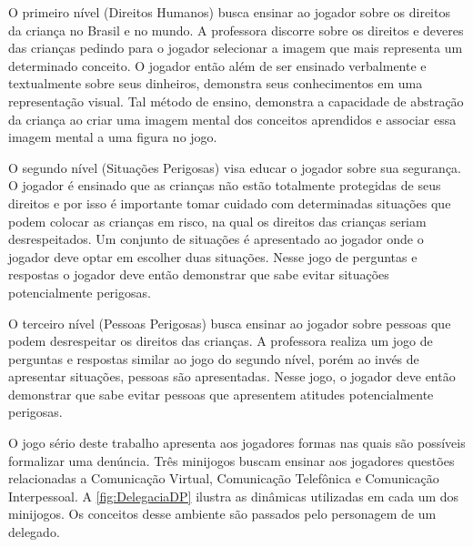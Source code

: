 O primeiro nível (Direitos Humanos) busca ensinar ao jogador sobre os direitos da criança no Brasil e no mundo. A professora discorre sobre os direitos e deveres das crianças pedindo para o jogador selecionar a imagem que mais representa um determinado conceito. O jogador então além de ser ensinado verbalmente e textualmente sobre seus dinheiros, demonstra seus conhecimentos em uma representação visual. Tal método de ensino, demonstra a capacidade de abstração da criança ao criar uma imagem mental dos conceitos aprendidos e associar essa imagem mental a uma figura no jogo. 

O segundo nível (Situações Perigosas) visa educar o jogador sobre sua segurança. O jogador é ensinado que as crianças não estão totalmente protegidas de seus direitos e por isso é importante tomar cuidado com determinadas situações que podem colocar as crianças em risco, na qual os direitos das crianças seriam desrespeitados. Um conjunto de situações é apresentado ao jogador onde o jogador deve optar em escolher duas situações. Nesse jogo de perguntas e respostas o jogador deve então demonstrar que sabe evitar situações potencialmente perigosas.

O terceiro nível (Pessoas Perigosas) busca ensinar ao jogador sobre pessoas que podem desrespeitar os direitos das crianças. A professora realiza um jogo de perguntas e respostas similar ao jogo do segundo nível, porém ao invés de apresentar situações, pessoas são apresentadas. Nesse jogo, o jogador deve então demonstrar que sabe evitar pessoas que apresentem atitudes potencialmente perigosas.


O jogo sério deste trabalho apresenta aos jogadores formas nas quais são possíveis formalizar uma denúncia. Três minijogos buscam ensinar aos jogadores questões relacionadas a Comunicação Virtual, Comunicação Telefônica e Comunicação Interpessoal. A \autoref{fig:DelegaciaDP} ilustra as dinâmicas utilizadas em cada um dos minijogos. Os conceitos desse ambiente são passados pelo personagem de um delegado. 

